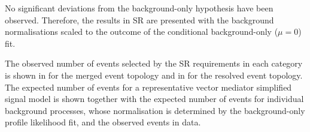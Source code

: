 No significant deviations from the background-only hypothesis have been observed. Therefore, the results in SR are presented with the background normalisations scaled to the outcome of the conditional background-only (\(\mu = 0\)) fit.

The observed number of events selected by the SR requirements in each category is shown in  for the merged event topology and in  for the resolved event topology.
The expected number of events for a representative vector mediator simplified signal model is shown together with the expected number of events for individual background processes, whose normalisation is determined by the background-only profile likelihood fit, and the observed events in data.

